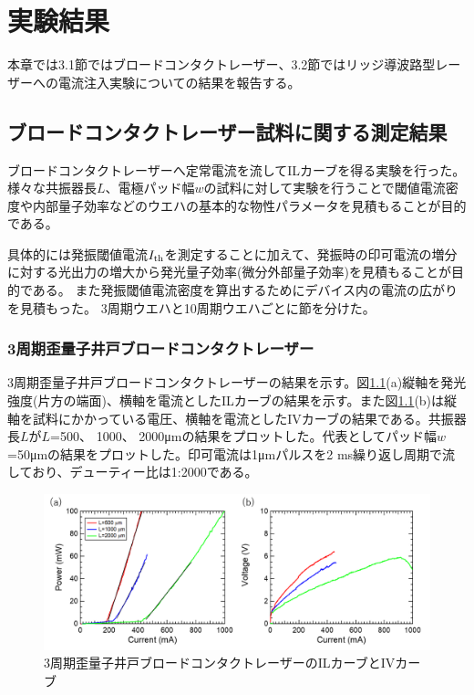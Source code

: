 \chapter{実験結果}
本章では3.1節ではブロードコンタクトレーザー、3.2節ではリッジ導波路型レーザーへの電流注入実験についての結果を報告する。
\section{ブロードコンタクトレーザー試料に関する測定結果}%
ブロードコンタクトレーザーへ定常電流を流してILカーブを得る実験を行った。様々な共振器長$L$、電極パッド幅$w$の試料に対して実験を行うことで閾値電流密度や内部量子効率などのウエハの基本的な物性パラメータを見積もることが目的である。

具体的には発振閾値電流$I_{\rm{th}}$を測定することに加えて、発振時の印可電流の増分に対する光出力の増大から発光量子効率(微分外部量子効率)を見積もることが目的である。
また発振閾値電流密度を算出するためにデバイス内の電流の広がりを見積もった。
3周期ウエハと10周期ウエハごとに節を分けた。
\subsection{3周期歪量子井戸ブロードコンタクトレーザー}%
3周期歪量子井戸ブロードコンタクトレーザーの結果を示す。図\ref{fig:fig_3_1_3QW_broacdcontact_IL}(a)縦軸を発光強度(片方の端面)、横軸を電流としたILカーブの結果を示す。また図\ref{fig:fig_3_1_3QW_broacdcontact_IL}(b)は縦軸を試料にかかっている電圧、横軸を電流としたIVカーブの結果である。共振器長$L$が$L$=500、 1000、 2000\si{ \micro\metre}の結果をプロットした。代表としてパッド幅$w$=50\si{ \micro\metre}の結果をプロットした。印可電流は1\si{ \micro\metre}パルスを2 ms繰り返し周期で流しており、デューティー比は1:2000である。

\begin{figure}[h]
	\centering
	\includegraphics[width=15cm]{figure/fig_3_1_3QW_broadcontact_IL.png}
		\caption{3周期歪量子井戸ブロードコンタクトレーザーのILカーブとIVカーブ}
		\label{fig:fig_3_1_3QW_broacdcontact_IL}
\end{figure}

